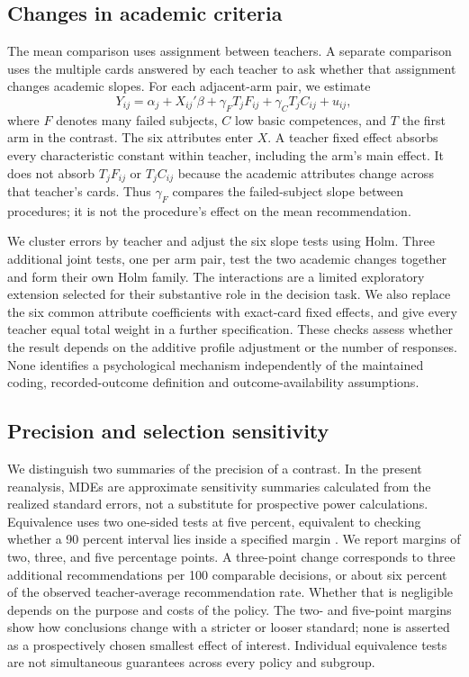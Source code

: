 \subsection{Changes in academic criteria}
\begin{addition}
The mean comparison uses assignment between teachers. A separate comparison uses the multiple cards answered by each teacher to ask whether that assignment changes academic slopes. For each adjacent-arm pair, we estimate
\[
Y_{ij}=\alpha_j+X_{ij}'\beta+\gamma_F T_j F_{ij}+\gamma_C T_j C_{ij}+u_{ij},
\]
where $F$ denotes many failed subjects, $C$ low basic competences, and $T$ the first arm in the contrast. The six attributes enter $X$. A teacher fixed effect absorbs every characteristic constant within teacher, including the arm's main effect. It does not absorb $T_jF_{ij}$ or $T_jC_{ij}$ because the academic attributes change across that teacher's cards. Thus $\gamma_F$ compares the failed-subject slope between procedures; it is not the procedure's effect on the mean recommendation.

We cluster errors by teacher and adjust the six slope tests using Holm. Three additional joint tests, one per arm pair, test the two academic changes together and form their own Holm family. The interactions are a limited exploratory extension selected for their substantive role in the decision task. We also replace the six common attribute coefficients with exact-card fixed effects, and give every teacher equal total weight in a further specification. These checks assess whether the result depends on the additive profile adjustment or the number of responses. None identifies a psychological mechanism independently of the maintained coding, recorded-outcome definition and outcome-availability assumptions.
\end{addition}

\subsection{Precision and selection sensitivity}
We distinguish two summaries of the precision of a contrast.
In the present reanalysis, MDEs are approximate sensitivity summaries calculated from the realized standard errors, not a substitute for prospective power calculations. Equivalence uses two one-sided tests at five percent, equivalent to checking whether a 90 percent interval lies inside a specified margin \cite{equivalence}. We report margins of two, three, and five percentage points. A three-point change corresponds to three additional recommendations per 100 comparable decisions, or about six percent of the observed teacher-average recommendation rate. Whether that is negligible depends on the purpose and costs of the policy. The two- and five-point margins show how conclusions change with a stricter or looser standard; none is asserted as a prospectively chosen smallest effect of interest. Individual equivalence tests are not simultaneous guarantees across every policy and subgroup.

